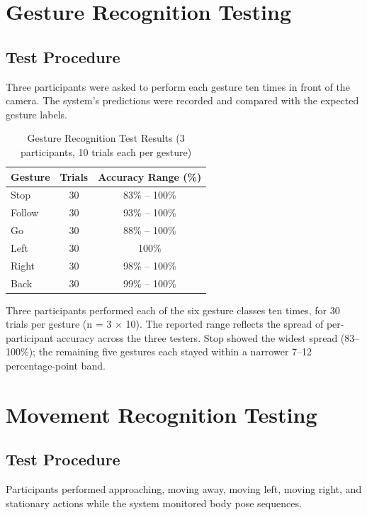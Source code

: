 \section{Gesture Recognition Testing}

\subsection{Test Procedure}

Three participants were asked to perform each gesture ten times in front of the camera. The system's predictions were recorded and compared with the expected gesture labels.

\begin{table}[H]
\centering
\caption{Gesture Recognition Test Results (3 participants, 10 trials each per gesture)}
\label{tab:gesture_results}
\begin{tabular}{|l|c|c|}
\hline
\textbf{Gesture} & \textbf{Trials} & \textbf{Accuracy Range (\%)} \\
\hline
Stop & 30 & 83\% -- 100\% \\
\hline
Follow & 30 & 93\% -- 100\% \\
\hline
Go & 30 & 88\% -- 100\% \\
\hline
Left & 30 & 100\% \\
\hline
Right & 30 & 98\% -- 100\% \\
\hline
Back & 30 & 99\% -- 100\% \\
\hline
\end{tabular}
\end{table}

Three participants performed each of the six gesture classes ten times, for 30 trials
per gesture (n = 3 $\times$ 10). The reported range reflects the spread of per-participant
accuracy across the three testers. Stop showed the widest spread (83--100\%); the
remaining five gestures each stayed within a narrower 7--12 percentage-point band.

\section{Movement Recognition Testing}

\subsection{Test Procedure}

Participants performed approaching, moving away, moving left, moving right, and stationary actions while the system monitored body pose sequences.

